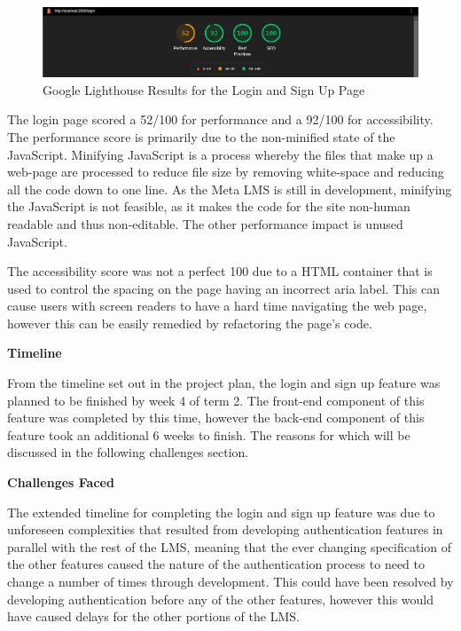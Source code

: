 \begin{figure}[h!]
    \centering
    \includegraphics[scale=0.3]{images/accounts-login-lighthouse.jpg}
    \caption{Google Lighthouse Results for the Login and Sign Up Page}
\end{figure}

The login page scored a 52/100 for performance and a 92/100 for accessibility. The performance score is primarily due to the non-minified state of the JavaScript. Minifying JavaScript is a process whereby the files that make up a web-page are processed to reduce file size by removing white-space and reducing all the code down to one line. As the Meta LMS is still in development, minifying the JavaScript is not feasible, as it makes the code for the site non-human readable and thus non-editable. The other performance impact is unused JavaScript.

The accessibility score was not a perfect 100 due to a HTML container that is used to control the spacing on the page having an incorrect aria label. This can cause users with screen readers to have a hard time navigating the web page, however this can be easily remedied by refactoring the page's code.

\textbf{Timeline}

From the timeline set out in the project plan, the login and sign up feature was planned to be finished by week 4 of term 2. The front-end component of this feature was completed by this time, however the back-end component of this feature took an additional 6 weeks to finish. The reasons for which will be discussed in the following challenges section.

\textbf{Challenges Faced}

The extended timeline for completing the login and sign up feature was due to unforeseen complexities that resulted from developing authentication features in parallel with the rest of the LMS, meaning that the ever changing specification of the other features caused the nature of the authentication process to need to change a number of times through development. This could have been resolved by developing authentication before any of the other features, however this would have caused delays for the other portions of the LMS.


